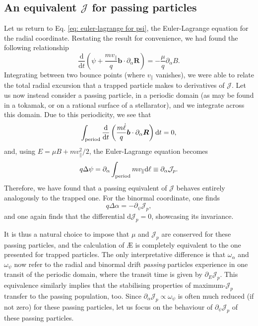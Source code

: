 \subsection*{An equivalent $\mathcal{J}$ for passing particles}
Let us return to Eq. \eqref{eq: euler-lagrange for psi}, the Euler-Lagrange equation for the radial coordinate. Restating the result for convenience, we had found the following relationship
\begin{equation}
    \frac{\mathrm{d}}{\mathrm{d}t}\left( \psi + \frac{m v_\parallel}{q} \boldsymbol{b} \cdot \partial_\alpha \boldsymbol{R} \right) = - \frac{\mu}{q} \partial_\alpha B.
\end{equation}
Integrating between two bounce points (where $v_\parallel$ vanishes), we were able to relate the total radial excursion that a trapped particle makes to derivatives of $\mathcal{J}$. Let us now instead consider a passing particle, in a periodic domain (as may be found in a tokamak, or on a rational surface of a stellarator), and we integrate across this domain. Due to this periodicity, we see that
\begin{equation}
    \int_{\rm period} \frac{\mathrm{d}}{\mathrm{d}t} \left( \frac{m \dot{\ell}}{q} \boldsymbol{b} \cdot \partial_\alpha \boldsymbol{R} \right) \mathrm{d} t = 0,
\end{equation}
and, using $E = \mu B + m v_\parallel^2/2$, the Euler-Lagrange equation becomes
\begin{equation}
    q\Delta \psi = \partial_\alpha \int_{\rm period} m v_\parallel \mathrm{d} \ell \equiv \partial_\alpha \mathcal{J}_{p}.
\end{equation}
Therefore, we have found that a passing equivalent of $\mathcal{J}$ behaves entirely analogously to the trapped one. For the binormal coordinate, one finds
\begin{equation}
    q\Delta \alpha = - \partial_\psi \mathcal{J}_p,
\end{equation}
and one again finds that the differential $\mathrm{d}\mathcal{J}_p = 0$, showcasing its invariance. \par 
It is thus a natural choice to impose that $\mu$ and $\mathcal{J}_p$ are conserved for these passing particles, and the calculation of \AE{} is completely equivalent to the one presented for trapped particles. The only interpretative difference is that $\omega_\alpha$ and $\omega_\psi$ now refer to the radial and binormal drift \textit{passing} particles experience in one transit of the periodic domain, where the transit time is given by $\partial_E \mathcal{J}_p$. This equivalence similarly implies that the stabilising properties of maximum-$\mathcal{J}_p$ transfer to the passing population, too. Since $\partial_\alpha \mathcal{J}_p \propto \omega_\psi$ is often much reduced (if not zero) for these passing particles, let us focus on the behaviour of $\partial_\psi \mathcal{J}_p$ of these passing particles.


